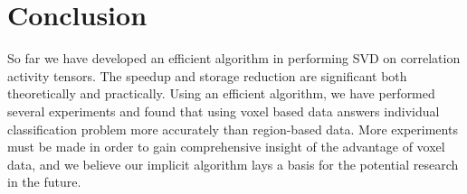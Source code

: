 \documentclass{article}[12pt]
\begin{document}
\section{Conclusion}

So far we have developed an efficient algorithm in performing SVD on correlation activity tensors. The speedup and storage reduction are significant both theoretically and practically. Using an efficient algorithm, we have performed several experiments and found that using voxel based data answers individual classification problem more accurately than region-based data.  More experiments must be made in order to gain comprehensive insight of the advantage of voxel data, and we believe our implicit algorithm lays a basis for the potential research in the future. 

\newpage


\end{document}
